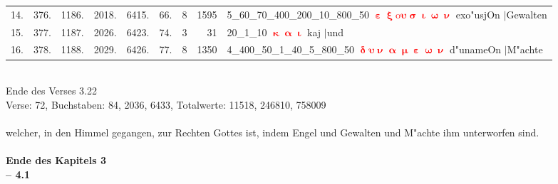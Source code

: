 \documentclass[a4paper,10pt,landscape]{article}
\begin{document}
\begin{tabular}{rrrrrrrrp{120mm}}
14.&376.&1186.&2018.&6415.&66.&8&1595&5\_60\_70\_400\_200\_10\_800\_50 \textcolor{red}{$\boldsymbol{\upepsilon\upxi\mathrm{o}\upsilon\upsigma\upiota\upomega\upnu}$} exo"usjOn $|$Gewalten\\
15.&377.&1187.&2026.&6423.&74.&3&31&20\_1\_10 \textcolor{red}{$\boldsymbol{\upkappa\upalpha\upiota}$} kaj $|$und\\
16.&378.&1188.&2029.&6426.&77.&8&1350&4\_400\_50\_1\_40\_5\_800\_50 \textcolor{red}{$\boldsymbol{\updelta\upsilon\upnu\upalpha\upmu\upepsilon\upomega\upnu}$} d"unameOn $|$M"achte\\
\end{tabular}\medskip \\
Ende des Verses 3.22\\
Verse: 72, Buchstaben: 84, 2036, 6433, Totalwerte: 11518, 246810, 758009\\
\\
welcher, in den Himmel gegangen, zur Rechten Gottes ist, indem Engel und Gewalten und M"achte ihm unterworfen sind.\\
\\
{\bf Ende des Kapitels 3}\\
\newpage 
{\bf -- 4.1}\\
\medskip \\
\end{document}

